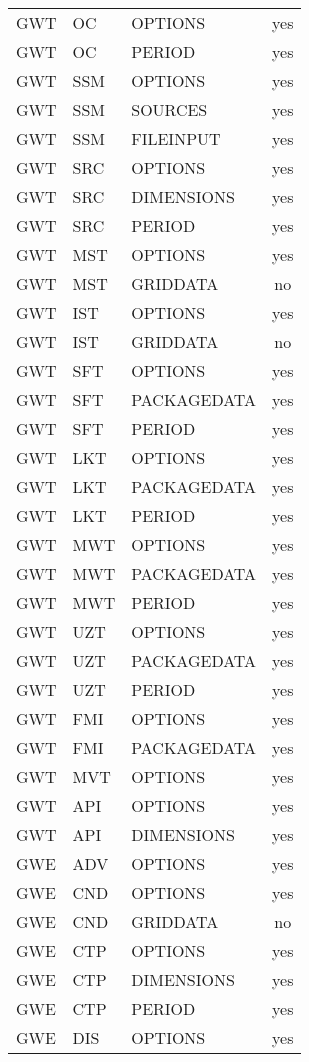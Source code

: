 \begin{longtable}{p{1.5cm} p{1.5cm} p{3cm} c}
\hline
GWT & OC & OPTIONS & yes \\ 
GWT & OC & PERIOD & yes \\ 
\hline
GWT & SSM & OPTIONS & yes \\ 
GWT & SSM & SOURCES & yes \\ 
GWT & SSM & FILEINPUT & yes \\ 
\hline
GWT & SRC & OPTIONS & yes \\ 
GWT & SRC & DIMENSIONS & yes \\ 
GWT & SRC & PERIOD & yes \\ 
\hline
GWT & MST & OPTIONS & yes \\ 
GWT & MST & GRIDDATA & no \\ 
\hline
GWT & IST & OPTIONS & yes \\ 
GWT & IST & GRIDDATA & no \\ 
\hline
GWT & SFT & OPTIONS & yes \\ 
GWT & SFT & PACKAGEDATA & yes \\ 
GWT & SFT & PERIOD & yes \\ 
\hline
GWT & LKT & OPTIONS & yes \\ 
GWT & LKT & PACKAGEDATA & yes \\ 
GWT & LKT & PERIOD & yes \\ 
\hline
GWT & MWT & OPTIONS & yes \\ 
GWT & MWT & PACKAGEDATA & yes \\ 
GWT & MWT & PERIOD & yes \\ 
\hline
GWT & UZT & OPTIONS & yes \\ 
GWT & UZT & PACKAGEDATA & yes \\ 
GWT & UZT & PERIOD & yes \\ 
\hline
GWT & FMI & OPTIONS & yes \\ 
GWT & FMI & PACKAGEDATA & yes \\ 
\hline
GWT & MVT & OPTIONS & yes \\ 
\hline
GWT & API & OPTIONS & yes \\ 
GWT & API & DIMENSIONS & yes \\ 
\hline
GWE & ADV & OPTIONS & yes \\ 
\hline
GWE & CND & OPTIONS & yes \\ 
GWE & CND & GRIDDATA & no \\ 
\hline
GWE & CTP & OPTIONS & yes \\ 
GWE & CTP & DIMENSIONS & yes \\ 
GWE & CTP & PERIOD & yes \\ 
\hline
GWE & DIS & OPTIONS & yes \\ 

\end{longtable}
